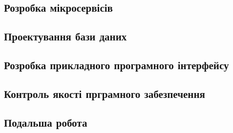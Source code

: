 \documentclass[a4paper,14pt]{extarticle} %
\begin{document}
\subsection{Розробка мікросервісів} 





\subsection{Проектування бази даних}






\subsection{Розробка прикладного програмного інтерфейсу} 






\subsection{Контроль якості прграмного забезпечення}



\subsection{Подальша робота}



\end{document}
